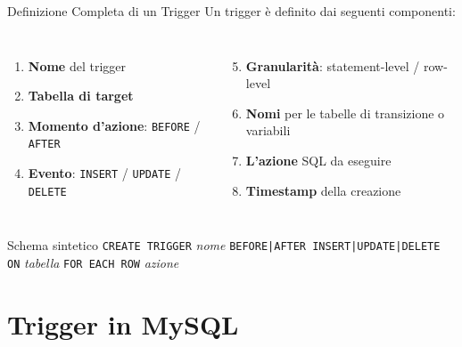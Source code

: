 \documentclass[aspectratio=169]{beamer}
\begin{document}
\begin{frame}{Definizione Completa di un Trigger}
  Un trigger è definito dai seguenti componenti:
  \vspace{0.2cm}
  \begin{columns}[T]
      \begin{enumerate}
        \item \textbf{Nome} del trigger
        \item \textbf{Tabella di target}
        \item \textbf{Momento d'azione}: \texttt{BEFORE} / \texttt{AFTER}
        \item \textbf{Evento}: \texttt{INSERT} / \texttt{UPDATE} / \texttt{DELETE}
      \end{enumerate}
      \begin{enumerate}\setcounter{enumi}{4}
        \item \textbf{Granularità}: statement-level / row-level
        \item \textbf{Nomi} per le tabelle di transizione o variabili
        \item \textbf{L'azione} SQL da eseguire
        \item \textbf{Timestamp} della creazione
      \end{enumerate}
  \end{columns}
  \vspace{0.4cm}
  \begin{exampleblock}{Schema sintetico}
    \texttt{CREATE TRIGGER} \textit{nome}
    \texttt{BEFORE|AFTER INSERT|UPDATE|DELETE ON} \textit{tabella}
    \texttt{FOR EACH ROW} \textit{azione}
  \end{exampleblock}
\end{frame}

\section{Trigger in MySQL}
\end{document}
